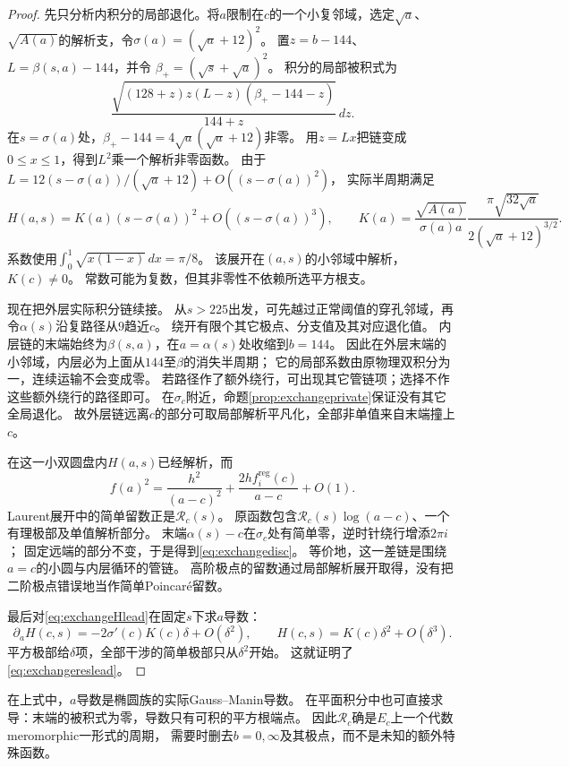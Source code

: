 \documentclass[11pt,a4paper]{ctexart}
\theoremstyle{cnplain}\newtheorem{theorem}{定理}[section]
\theoremstyle{definition}\newtheorem{definition}[theorem]{定义}
\theoremstyle{remark}\newtheorem{remark}[theorem]{注}
\begin{document}
\begin{proof}
先只分析内积分的局部退化。将$a$限制在$c$的一个小复邻域，选定$\sqrt a$、
$\sqrt{A(a)}$的解析支，令$\sigma(a)=(\sqrt a+12)^2$。
置$z=b-144$、$L=\beta(s,a)-144$，并令
$\beta_+=(\sqrt s+\sqrt a)^2$。
积分的局部被积式为
\[
 \frac{\sqrt{(128+z)z(L-z)(\beta_+-144-z)}}{144+z}\,dz .
\]
在$s=\sigma(a)$处，$\beta_+-144=4\sqrt a(\sqrt a+12)$非零。
用$z=Lx$把链变成$0\le x\le1$，得到$L^2$乘一个解析非零函数。
由于$L=12(s-\sigma(a))/(\sqrt a+12)+O((s-\sigma(a))^2)$，
实际半周期满足
\begin{equation}\label{eq:exchangeHlead}
 H(a,s)=K(a)(s-\sigma(a))^2+O((s-\sigma(a))^3),
 \qquad
 K(a)=\frac{\sqrt{A(a)}}{\sigma(a)a}
       \frac{\pi\sqrt{32\sqrt a}}{2(\sqrt a+12)^{3/2}} .
\end{equation}
系数使用$\int_0^1\sqrt{x(1-x)}\,dx=\pi/8$。
该展开在$(a,s)$的小邻域中解析，$K(c)\ne0$。
常数可能为复数，但其非零性不依赖所选平方根支。

现在把外层实际积分链续接。
从$s>225$出发，可先越过正常阈值的穿孔邻域，再令$\alpha(s)$沿复路径从$9$趋近$c$。
绕开有限个其它极点、分支值及其对应退化值。
内层链的末端始终为$\beta(s,a)$，在$a=\alpha(s)$处收缩到$b=144$。
因此在外层末端的小邻域，内层必为上面从$144$至$\beta$的消失半周期；
它的局部系数由原物理双积分为一，连续运输不会变成零。
若路径作了额外绕行，可出现其它管链项；选择不作这些额外绕行的路径即可。
在$\sigma_c$附近，命题\ref{prop:exchangeprivate}保证没有其它全局退化。
故外层链远离$c$的部分可取局部解析平凡化，全部非单值来自末端撞上$c$。

在这一小双圆盘内$H(a,s)$已经解析，而
\[
 f(a)^2=\frac{h^2}{(a-c)^2}
          +\frac{2h f_i^{\mathrm{reg}}(c)}{a-c}+O(1).
\]
Laurent展开中的简单留数正是$\mathcal R_c(s)$。
原函数包含$\mathcal R_c(s)\log(a-c)$、一个有理极部及单值解析部分。
末端$\alpha(s)-c$在$\sigma_c$处有简单零，逆时针绕行增添$2\pi i$；
固定远端的部分不变，于是得到\eqref{eq:exchangedisc}。
等价地，这一差链是围绕$a=c$的小圆与内层循环的管链。
高阶极点的留数通过局部解析展开取得，没有把二阶极点错误地当作简单Poincaré留数。

最后对\eqref{eq:exchangeHlead}在固定$s$下求$a$导数：
\[
 \partial_aH(c,s)=-2\sigma'(c)K(c)\delta+O(\delta^2),
 \qquad H(c,s)=K(c)\delta^2+O(\delta^3).
\]
平方极部给$\delta$项，全部干涉的简单极部只从$\delta^2$开始。
这就证明了\eqref{eq:exchangereslead}。
\end{proof}

在上式中，$a$导数是椭圆族的实际Gauss--Manin导数。
在平面积分中也可直接求导：末端的被积式为零，导数只有可积的平方根端点。
因此$\mathcal R_c$确是$E_c$上一个代数meromorphic一形式的周期，
需要时删去$b=0,\infty$及其极点，而不是未知的额外特殊函数。
\end{document}
